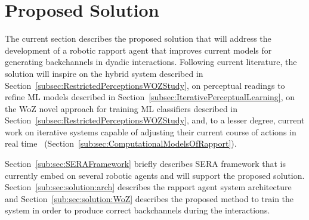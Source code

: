 \section{Proposed Solution}
\label{sec:Solution}

The current section describes the proposed solution that will address the development of a robotic rapport agent that improves current models for generating backchannels in dyadic interactions. Following current literature, the solution will inspire on the hybrid system described in Section~\ref{subsec:RestrictedPerceptionsWOZStudy}, on perceptual readings to refine \ac{ML} models described in Section~\ref{subsec:IterativePerceptualLearning}, on the \ac{WoZ} novel approach for training \ac{ML} classifiers described in Section~\ref{subsec:RestrictedPerceptionsWOZStudy}, and, to a lesser degree, current work on iterative systems capable of adjusting their current course of actions in real time~\cite{Kopp2007, Zwiers2011, Reidsma2011, Visser2014} (Section~\ref{sub:sec:ComputationalModelsOfRapport}).

Section~\ref{sub:sec:SERAFramework} briefly describes \ac{SERA} framework that is currently embed on several robotic agents and will support the proposed solution. Section~\ref{sub:sec:solution:arch} describes the rapport agent system architecture and Section~\ref{sub:sec:solution:WoZ} describes the proposed method to train the system in order to produce correct backchannels during the interactions.




